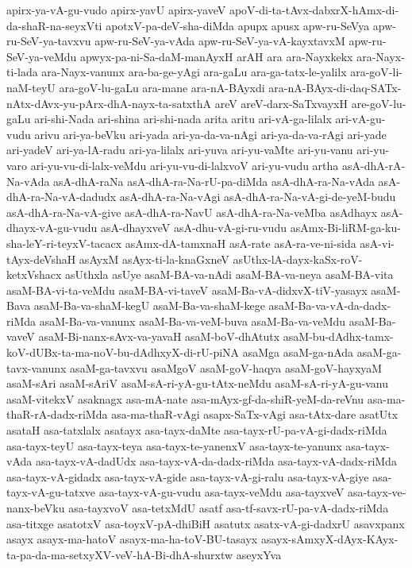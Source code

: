 {apirx-ya-vA-gu-vudo
apirx-yavU
apirx-yaveV
apoV-di-ta-tAvx-dabxrX-hAmx-di-da-shaR-na-seyxVti
apotxV-pa-deV-sha-diMda
apupx
apusx
apw-ru-SeVya
apw-ru-SeV-ya-tavxvu
apw-ru-SeV-ya-vAda
apw-ru-SeV-ya-vA-kayxtavxM
apw-ru-SeV-ya-veMdu
apwyx-pa-ni-Sa-daM-manAyxH
arAH
ara
ara-Nayxkekx
ara-Nayx-ti-lada
ara-Nayx-vanunx
ara-ba-ge-yAgi
ara-gaLu
ara-ga-tatx-le-yalilx
ara-goV-li-naM-teyU
ara-goV-lu-gaLu
ara-mane
ara-nA-BAyxdi
ara-nA-BAyx-di-daq-SATx-nAtx-dAvx-yu-pArx-dhA-nayx-ta-satxthA
areV
areV-darx-SaTxvayxH
are-goV-lu-gaLu
ari-shi-Nada
ari-shina
ari-shi-nada
arita
aritu
ari-vA-ga-lilalx
ari-vA-gu-vudu
arivu
ari-ya-beVku
ari-yada
ari-ya-da-va-nAgi
ari-ya-da-va-rAgi
ari-yade
ari-yadeV
ari-ya-lA-radu
ari-ya-lilalx
ari-yuva
ari-yu-vaMte
ari-yu-vanu
ari-yu-varo
ari-yu-vu-di-lalx-veMdu
ari-yu-vu-di-lalxvoV
ari-yu-vudu
artha
asA-dhA-rA-Na-vAda
asA-dhA-raNa
asA-dhA-ra-Na-rU-pa-diMda
asA-dhA-ra-Na-vAda
asA-dhA-ra-Na-vA-dadudx
asA-dhA-ra-Na-vAgi
asA-dhA-ra-Na-vA-gi-de-yeM-budu
asA-dhA-ra-Na-vA-give
asA-dhA-ra-NavU
asA-dhA-ra-Na-veMba
asAdhayx
asA-dhayx-vA-gu-vudu
asA-dhayxveV
asA-dhu-vA-gi-ru-vudu
asAmx-Bi-liRM-ga-ku-sha-leY-ri-teyxV-tacacx
asAmx-dA-tamxnaH
asA-rate
asA-ra-ve-ni-sida
asA-vi-tAyx-deVshaH
asAyxM
asAyx-ti-la-knaGxneV
asUthx-lA-dayx-kaSx-roV-ketxVshacx
asUthxla
asUye
asaM-BA-va-nAdi
asaM-BA-va-neya
asaM-BA-vita
asaM-BA-vi-ta-veMdu
asaM-BA-vi-taveV
asaM-Ba-vA-didxvX-tiV-yasayx
asaM-Bava
asaM-Ba-va-shaM-kegU
asaM-Ba-va-shaM-kege
asaM-Ba-va-vA-da-dadx-riMda
asaM-Ba-va-vanunx
asaM-Ba-va-veM-buva
asaM-Ba-va-veMdu
asaM-Ba-vaveV
asaM-Bi-nanx-sAvx-va-yavaH
asaM-boV-dhAtutx
asaM-bu-dAdhx-tamx-koV-dUBx-ta-ma-noV-bu-dAdhxyX-di-rU-piNA
asaMga
asaM-ga-nAda
asaM-ga-tavx-vanunx
asaM-ga-tavxvu
asaMgoV
asaM-goV-haqya
asaM-goV-hayxyaM
asaM-sAri
asaM-sAriV
asaM-sA-ri-yA-gu-tAtx-neMdu
asaM-sA-ri-yA-gu-vanu
asaM-vitekxV
asaknagx
asa-mA-nate
asa-mAyx-gf-da-shiR-yeM-da-reVnu
asa-ma-thaR-rA-dadx-riMda
asa-ma-thaR-vAgi
asapx-SaTx-vAgi
asa-tAtx-dare
asatUtx
asataH
asa-tatxlalx
asatayx
asa-tayx-daMte
asa-tayx-rU-pa-vA-gi-dadx-riMda
asa-tayx-teyU
asa-tayx-teya
asa-tayx-te-yanenxV
asa-tayx-te-yanunx
asa-tayx-vAda
asa-tayx-vA-dadUdx
asa-tayx-vA-da-dadx-riMda
asa-tayx-vA-dadx-riMda
asa-tayx-vA-gidadx
asa-tayx-vA-gide
asa-tayx-vA-gi-ralu
asa-tayx-vA-giye
asa-tayx-vA-gu-tatxve
asa-tayx-vA-gu-vudu
asa-tayx-veMdu
asa-tayxveV
asa-tayx-ve-nanx-beVku
asa-tayxvoV
asa-tetxMdU
asatf
asa-tf-savx-rU-pa-vA-dadx-riMda
asa-titxge
asatotxV
asa-toyxV-pA-dhiBiH
asatutx
asatx-vA-gi-dadxrU
asavxpanx
asayx
asayx-ma-hatoV
asayx-ma-ha-toV-BU-tasayx
asayx-sAmxyX-dAyx-KAyx-ta-pa-da-ma-setxyXV-veV-hA-Bi-dhA-shurxtw
aseyxYva
}
